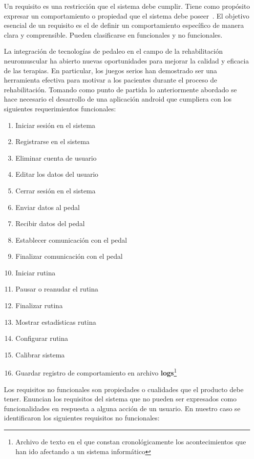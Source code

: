 Un requisito es una restricción que el sistema debe cumplir. Tiene como propósito expresar un comportamiento o propiedad que el sistema debe poseer~\cite{jacobson2000uml}. El objetivo esencial de un requisito es el de definir un comportamiento específico de manera clara y comprensible. Pueden clasificarse en funcionales y no funcionales.

La integración de tecnologías de pedaleo en el campo de la rehabilitación neuromuscular ha abierto nuevas oportunidades para mejorar la calidad y eficacia de las terapias. En particular, los juegos serios han demostrado ser una herramienta efectiva para motivar a los pacientes durante el proceso de rehabilitación. Tomando como punto de partida lo anteriormente abordado se hace necesario el desarrollo de una aplicación android que cumpliera con los siguientes requerimientos funcionales:    

\begin{enumerate}
    \item Iniciar sesión en el sistema
    \item Registrarse en el sistema
    \item Eliminar cuenta de usuario
    \item Editar los datos del usuario
    \item Cerrar sesión en el sistema
    \item Enviar datos al pedal
    \item Recibir datos del pedal
    \item Establecer comunicación con el pedal
    \item Finalizar comunicación con el pedal
    \item Iniciar rutina
    \item Pausar o reanudar el rutina
    \item Finalizar rutina
    \item Mostrar estadísticas rutina
    \item Configurar rutina
    \item Calibrar sistema
    \item Guardar registro de comportamiento en archivo \textbf{logs}\footnote{Archivo de texto en el que constan cronológicamente los acontecimientos que han ido afectando a un sistema informático}
\end{enumerate}


Los requisitos no funcionales son propiedades o cualidades que el producto debe tener. Enuncian los requisitos del sistema que no pueden ser expresados como funcionalidades en respuesta a alguna acción de un usuario. En nuestro caso se identificaron los siguientes requisitos no funcionales:
        
